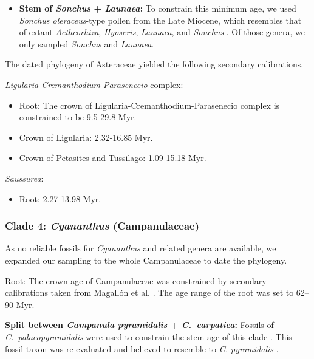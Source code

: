 \documentclass[10pt]{article}
\begin{document}
\begin{itemize}
\item \textbf{Stem of \textit{Sonchus} + \textit{Launaea}:} To
  constrain this minimum age, we used \textit{Sonchus oleraceus}-type
  pollen from the Late Miocene, which resembles that of extant
  \textit{Aetheorhiza}, \textit{Hyoseris}, \textit{Launaea}, and
  \textit{Sonchus} \citep{Blackmore1986}. Of those genera, we only
  sampled \textit{Sonchus} and \textit{Launaea}.

\end{itemize}

The dated phylogeny of Asteraceae yielded the following secondary
calibrations. %

\textit{Ligularia-Cremanthodium-Parasenecio} complex: 


\begin{itemize}

\item Root: The crown of Ligularia-Cremanthodium-Parasenecio complex
  is constrained to be 9.5-29.8 Myr.

\item Crown of Ligularia: 2.32-16.85 Myr.

\item Crown of Petasites and Tussilago: 1.09-15.18 Myr.

\end{itemize}


\textit{Saussurea}:

\begin{itemize}
\item Root: 2.27-13.98 Myr. %
\end{itemize}

\subsubsection*{Clade 4: \textit{Cyananthus} (Campanulaceae)}

As no reliable fossils for \textit{Cyananthus} and related genera are
available, we expanded our sampling to the whole Campanulaceae to date
the phylogeny.

Root: The crown age of Campanulaceae was constrained by secondary
calibrations taken from Magallón et al. \citep{Magallón2015}. The age
range of the root was set to 62--90 Myr.

\textbf{Split between \textit{Campanula pyramidalis} +
  \textit{C.~carpatica}:} Fossils of \textit{C.~palaeopyramidalis}
were used to constrain the stem age of this clade
\citep{Lancucka-Srodoniowa1979}. This fossil taxon was re-evaluated
and believed to resemble to \textit{C. pyramidalis}
\citep{Cellinese2009}.
\end{document}
